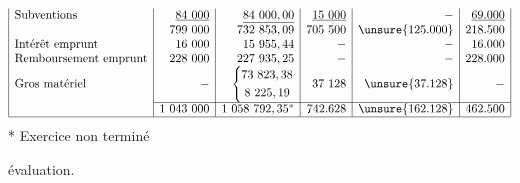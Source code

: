 \[\begin{array}{|l|r|r|r|r|r|}
\text{Subventions}&\underline{84\ 000}&\underline{84\ 000,00}&\underline{15\ 000}&-&\underline{69.000}\\
&799\ 000&732\ 853,09&705\ 500&\unsure{125.000}&218.500\\
\text{Intérêt emprunt}&16\ 000&15\ 955,44&-&-&16.000\\
\text{Remboursement emprunt}&228\ 000&227\ 935,25&-&-&228.000\\
\text{Gros matériel}&-&\left\{\begin{gathered}73\ 823,38\\8\ 225,19\end{gathered}\right.&37\ 128&\unsure{37.128}&-\\\cline{2-6}
&1\ 043\ 000&1\ 058\ 792,35^*&742.628&\unsure{162.128}&462.500\\\hline
\end{array}
\]
* Exercice non terminé\par
évaluation.
